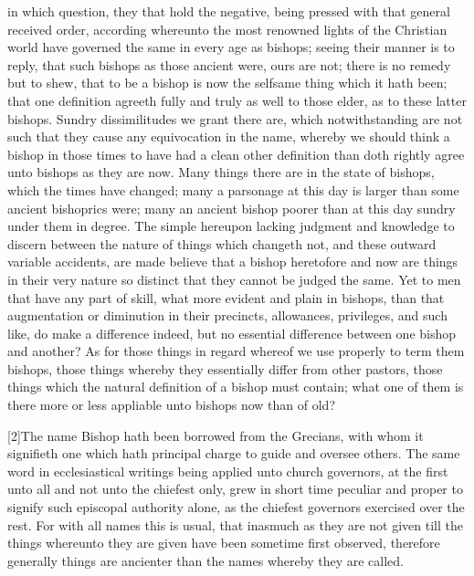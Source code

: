  in which question, they that hold the negative, being pressed with that general received order, according whereunto the most renowned lights of the Christian world have governed the same in every age as bishops; seeing their manner is to reply, that such bishops as those ancient were, ours are not; there is no remedy but to shew, that to be a bishop is now the selfsame thing which it hath been; that one definition agreeth fully and truly as well to those elder, as to these latter bishops. Sundry dissimilitudes we grant there are, which notwithstanding are not such that they cause any equivocation in the name, whereby we should think a bishop in those times to have had a clean other definition than doth rightly agree unto bishops as they are now. Many things there are in the state of bishops, which the times have changed; many a parsonage at this day is larger than some ancient bishoprics were; many an ancient bishop poorer than at this day sundry under them in degree. The simple hereupon lacking judgment and knowledge to discern between the nature of things which changeth not, and these outward variable accidents, are made believe that a bishop heretofore and now are things in their very nature so distinct that they cannot be judged the same. Yet to men that have any part of skill, what more evident and plain in bishops, than that augmentation or diminution in their precincts, allowances, privileges, and such like, do make a difference indeed, but no essential difference between one bishop and another? As for those things in regard whereof we use properly to term them bishops, those things whereby they essentially differ from other pastors, those things which the natural definition of a bishop must contain; what one of them is there more or less appliable unto bishops now than of old?

[2]The name Bishop hath been borrowed from the Grecians, with whom it signifieth one which hath principal charge to guide and oversee others. The same word in ecclesiastical  writings being applied unto church governors, at the first unto all and not unto the chiefest only, grew in short time peculiar and proper to signify such episcopal authority alone, as the chiefest governors exercised over the rest. For with all names this is usual, that inasmuch as they are not given till the things whereunto they are given have been sometime first observed, therefore generally things are ancienter than the names whereby they are called.

